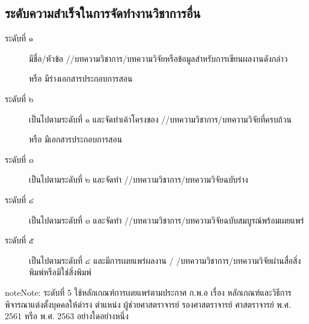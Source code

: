 \documentclass[a4paper,12pt,english]{sphinxmanual}
\begin{document}
\subsection{ระดับความสำเร็จในการจัดทำงานวิชาการอื่น}
\label{\detokenize{submission_part1:id15}}\begin{description}
\item[{ระดับที่ ๑}] \leavevmode
มีชื่อ/หัวข้อ {\hyperref[\detokenize{glossary:term-3}]{}}/{\hyperref[\detokenize{glossary:term-2}]{}}/บทความวิชาการ/บทความวิจัยหรือข้อมูลสำหรับการเขียนผลงานดังกล่าว

หรือ มีร่างเอกสารประกอบการสอน

\item[{ระดับที่ ๒}] \leavevmode
เป็นไปตามระดับที่ ๑ และจัดทำเค้าโครงของ {\hyperref[\detokenize{glossary:term-3}]{}}/{\hyperref[\detokenize{glossary:term-2}]{}}/บทความวิชาการ/บทความวิจัยที่ครบถ้วน

หรือ มีเอกสารประกอบการสอน

\item[{ระดับที่ ๓}] \leavevmode
เป็นไปตามระดับที่ ๒ และจัดทำ {\hyperref[\detokenize{glossary:term-3}]{}}/{\hyperref[\detokenize{glossary:term-2}]{}}/บทความวิชาการ/บทความวิจัยฉบับร่าง

\item[{ระดับที่ ๔}] \leavevmode
เป็นไปตามระดับที่ ๓ และจัดทำ {\hyperref[\detokenize{glossary:term-3}]{}}/{\hyperref[\detokenize{glossary:term-2}]{}}/บทความวิชาการ/บทความวิจัยฉบับสมบูรณ์พร้อมเผยแพร่

\item[{ระดับที่ ๕}] \leavevmode
เป็นไปตามระดับที่ ๔ และมีการเผยแพร่ผลงาน {\hyperref[\detokenize{glossary:term-3}]{}}/ {\hyperref[\detokenize{glossary:term-2}]{}}/บทความวิชาการ/บทความวิจัยผ่านสื่อสิ่งพิมพ์หรือมิใช่สิ่งพิมพ์

\end{description}

\begin{sphinxadmonition}{note}{Note:}
ระดับที่ 5 ใช้หลักเกณฑ์การเผยแพร่ตามประกาศ ก.พ.อ เรื่อง หลักเกณฑ์และวิธีการพิจารณาแต่งตั้งบุคคลให้ดำรง ตำแหน่ง ผู้ช่วยศาสตราจารย์
รองศาสตราจารย์ ศาสตราจารย์ พ.ศ. 2561 หรือ พ.ศ. 2563 อย่างใดอย่างหนึ่ง
\end{sphinxadmonition}
\end{document}
